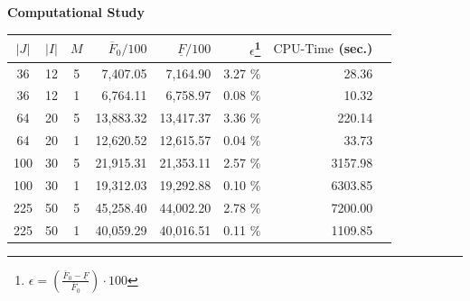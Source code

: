 %     



\begin{frame}{\textbf{Computational Study}}
\begin{center}
    \small
    \begin{tabular}{cccrrrrr}
    \toprule
        $|J|$ & $|I|$ & $M$ & $\overline{F}_0/100$ & $\underline{F}/100$ & $\epsilon$\footnote{$\epsilon=\left(\frac{\overline{F}_0-\underline{F}}{\overline{F}_0} \right) \cdot 100$} &  $\text{CPU-Time}$ (sec.)  \\ \midrule
        36 & 12 & 5 & 7,407.05 & 7,164.90 & 3.27 \%  & 28.36 \\
        36 & 12 & 1 & 6,764.11 & 6,758.97 & 0.08 \%   & 10.32  \\ \midrule
        64 & 20 & 5 & 13,883.32 & 13,417.37 & 3.36 \%  & 220.14  \\
        64 & 20 & 1 & 12,620.52 & 12,615.57 & 0.04 \% & 33.73 \\ \midrule
        100 & 30 & 5 & 21,915.31 & 21,353.11 & 2.57 \%  & 3157.98 \\
        100 & 30 & 1 & 19,312.03 & 19,292.88 & 0.10 \%  & 6303.85 \\ \midrule 
        225 & 50 & 5 & 45,258.40 & 44,002.20 & 2.78 \%  & 7200.00  \\
        225 & 50 & 1 & 40,059.29 & 40,016.51 & 0.11 \%  & 1109.85  \\ \bottomrule
    \end{tabular}
\end{center}
\end{frame}






